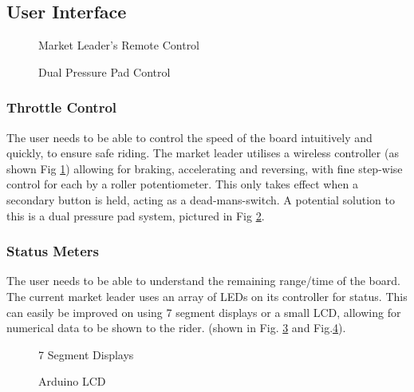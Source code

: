 \documentclass[journal,10pt]{IEEEtran}
\begin{document}
    \subsection{User Interface}
        \begin{figure}[H]
            \centering
            \caption{Market Leader's Remote Control}
            \label{fig:Boosted Remote}
        \end{figure}
        \begin{figure}[H]
            \centering
            \caption{Dual Pressure Pad Control}
            \label{fig:Pressure Pads}
        \end{figure}
            
    	\subsubsection{Throttle Control}
    		The user needs to be able to control the speed of the board intuitively and quickly, to ensure safe riding.
    		The market leader utilises a wireless controller (as shown Fig \ref{fig:Boosted Remote}) allowing for braking, accelerating and reversing, with fine step-wise control for each by a roller potentiometer.
    		This only takes effect when a secondary button is held, acting as a dead-mans-switch.
    		A potential solution to this is a dual pressure pad system, pictured in Fig \ref{fig:Pressure Pads}.
            
    	\subsubsection{Status Meters}
    		The user needs to be able to understand the remaining range/time of the board. The current market leader uses an array of LEDs on its controller for status. This can easily be improved on using 7 segment displays or a small LCD, allowing for numerical data to be shown to the rider. (shown in Fig. \ref{fig:7 seg} and Fig.\ref{fig:LCD}).
    		
    	\begin{figure}[H]
            \centering
            \caption{7 Segment Displays}
            \label{fig:7 seg}
        \end{figure}
    	\begin{figure}[H]
            \centering
            \caption{Arduino LCD}
            \label{fig:LCD}
        \end{figure}
\end{document}
